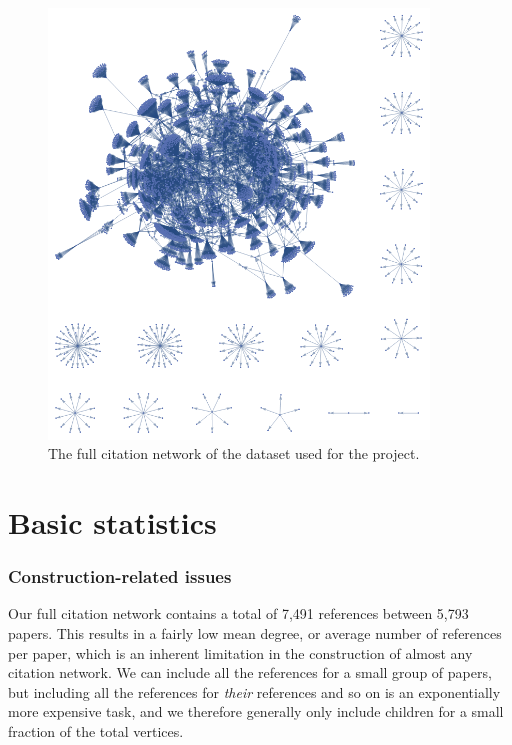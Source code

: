 \documentclass[12pt]{thesis}
\theoremstyle{plain}
\theoremstyle{definition}
\theoremstyle{remark}
\begin{document}
\begin{figure}[p]
\centering
\includegraphics[width=0.9\textwidth]{full_citation_network.png}
\caption{The full citation network of the dataset used for the project.}
\label{fig:full_database}
\end{figure}








\section{Basic statistics}

\subsubsection{Construction-related issues}

Our full citation network contains a total of 7,491 references between 5,793 papers. This results in a fairly low mean degree, or average number of references per paper, which is an inherent limitation in the construction of almost any citation network. We can include all the references for a small group of papers, but including all the references for \textit{their} references and so on is an exponentially more expensive task, and we therefore generally only include children for a small fraction of the total vertices. 
\end{document}
